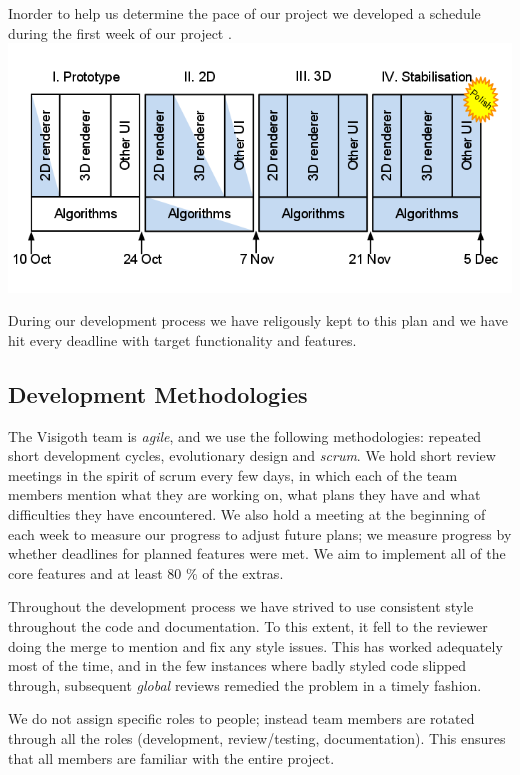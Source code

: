 \documentclass[a4paper,11pt,titlepage]{article}
\newcommand{\buzz}[1]{\emph{#1}}
\begin{document}
Inorder to help us determine the pace of our project we developed a schedule during the first week
of our project .\\
\includegraphics[scale=0.5]{schedule}

During our development process we have religously kept to this plan and we have hit every deadline
with target functionality and features.

\subsection{Development Methodologies}

The Visigoth team is \buzz{agile}, and we use the following methodologies: repeated short development cycles, evolutionary design and \buzz{scrum}.  We hold short review meetings in the spirit of scrum every few days, in which each of the team members mention what they are working on, what plans they have and what difficulties they have encountered. We also hold a meeting at the beginning of each week to measure our progress to adjust future plans; we measure progress by whether deadlines for planned features were met. We aim to implement all of the core features and at least 80 $\%$ of the extras.

Throughout the development process we have strived to use consistent style throughout the code and documentation. To this extent, it fell to the reviewer doing the merge to mention and fix any style issues. This has worked adequately most of the time, and in the few instances where badly styled code slipped through, subsequent \buzz{global} reviews remedied the problem in a timely fashion.

We do not assign specific roles to people; instead team members are rotated through all the roles (development, review/testing, documentation). This ensures that all members are familiar with the entire project.
\end{document}
